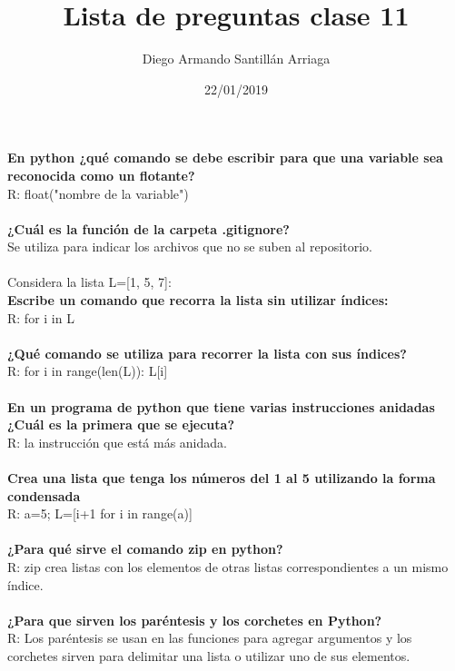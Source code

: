 \documentclass[letter paper, 12pt, oneside]{article}
\title{\Huge Lista de preguntas clase 11}
\author{Diego Armando Santillán Arriaga}
\date{22/01/2019}
\begin{document}
	\maketitle
	\newpage
	\textbf{En python ¿qué comando se debe escribir para que una variable sea reconocida como un flotante?}
	\\
	R: float("nombre de la variable")
	\\\\
	\textbf{¿Cuál es la función de la carpeta .gitignore?}
	\\
	Se utiliza para indicar los archivos que no se suben al repositorio.
	\\\\
	Considera la lista L=[1, 5, 7]:
	\\
	\textbf{Escribe un comando que recorra la lista sin utilizar índices:}
	\\
	R: for i in L
	\\\\
	\textbf{¿Qué comando se utiliza para recorrer la lista con sus índices?}
	\\ 
	R: for i in range(len(L)):
	L[i]
	\\\\
	\textbf{En un programa de python que tiene varias instrucciones anidadas ¿Cuál es la primera que se ejecuta?}
	\\
	R: la instrucción que está más anidada. 
	\\\\
	\textbf{Crea una lista que tenga los números del 1 al 5 utilizando la forma condensada}
	\\
	R: a=5; L=[i+1 for i in range(a)]
	\\\\
	\textbf{¿Para qué sirve el comando zip en python?}
	\\
	R: zip crea listas con los elementos de otras listas correspondientes a un mismo índice. 
	\\\\
	\textbf{¿Para que sirven los paréntesis y los corchetes en Python?}
	\\
	R: Los paréntesis se usan en las funciones para agregar argumentos y los corchetes sirven para delimitar una lista o utilizar uno de sus elementos.
\end{document}
